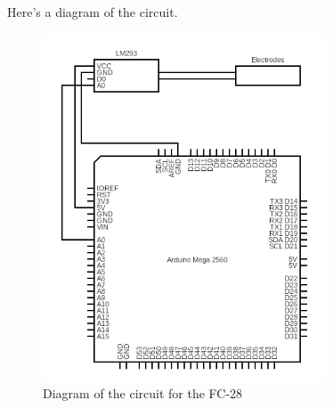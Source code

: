 \vspace{5mm}
Here's a diagram of the circuit.

\begin{figure}[H]
    \centering
    \includegraphics[width=0.75\textwidth]{fig/fc28-scheme-circuit.png}
    \caption{Diagram of the circuit for the FC-28}
    \label{fig:fc28-scheme-circuit}
\end{figure}

